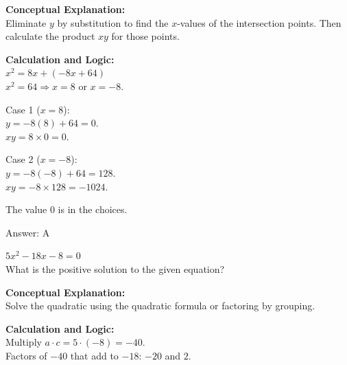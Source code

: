 \documentclass[11pt,paper=a4,answers]{exam}
\begin{document}
\begin{questions}
\begin{solution}
\textbf{Conceptual Explanation:} \\
Eliminate $y$ by substitution to find the $x$-values of the intersection points. Then calculate the product $xy$ for those points.

\vspace{20pt}

\textbf{Calculation and Logic:} \\
$x^2 = 8x + (-8x + 64)$ \\
$x^2 = 64 \Rightarrow x = 8$ or $x = -8$.

\vspace{10pt}

Case 1 ($x=8$): \\
$y = -8(8) + 64 = 0$. \\
$xy = 8 \times 0 = 0$.

\vspace{10pt}

Case 2 ($x=-8$): \\
$y = -8(-8) + 64 = 128$. \\
$xy = -8 \times 128 = -1024$.

\vspace{10pt}

The value 0 is in the choices.

\vspace{25pt}

Answer: \colorbox{yellow!100}{A}
\end{solution}

\vspace{40pt}

\question
$5x^2 - 18x - 8 = 0$ \\
What is the positive solution to the given equation?

\begin{solution}
\textbf{Conceptual Explanation:} \\
Solve the quadratic using the quadratic formula or factoring by grouping.

\vspace{20pt}

\textbf{Calculation and Logic:} \\
Multiply $a \cdot c = 5 \cdot (-8) = -40$. \\
Factors of $-40$ that add to $-18$: $-20$ and $2$.

\vspace{10pt}


\end{solution}
\end{questions}
\end{document}
